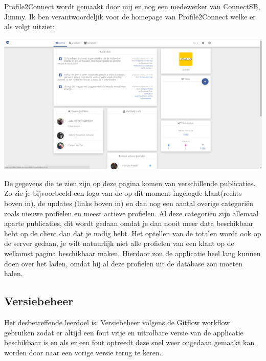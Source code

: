 \newline

Profile2Connect wordt gemaakt door mij en nog een medewerker van ConnectSB, Jimmy. Ik ben verantwoordeljik voor de homepage van Profile2Connect welke er als volgt uitziet:

\begin{center}
\includegraphics[scale=0.2]{profile2connect}
\end{center}


De gegevens die te zien zijn op deze pagina komen van verschillende publicaties. Zo zie je bijvoorbeeld een logo van de op dit moment ingelogde klant(rechts boven in), de updates (links boven in) en dan nog een aantal overige categoriën zoals nieuwe profielen en meest actieve profielen. Al deze categoriën zijn allemaal aparte publicaties, dit wordt gedaan omdat je dan nooit meer data beschikbaar hebt op de client dan dat je nodig hebt. Het optellen van de totalen wordt ook op de server gedaan, je wilt natuurlijk niet alle profielen van een klant op de welkomst pagina beschikbaar maken. Hierdoor zou de applicatie heel lang kunnen doen over het laden, omdat hij al deze profielen uit de database zou moeten halen.

\clearpage

\subsection{Versiebeheer}
Het desbetreffende leerdoel is: Versiebeheer volgens de Gitflow workflow gebruiken zodat er altijd een fout vrije en uitrolbare versie van de applicatie beschikbaar is en als er een fout optreedt deze snel weer ongedaan gemaakt kan worden door naar een vorige versie terug te keren.

